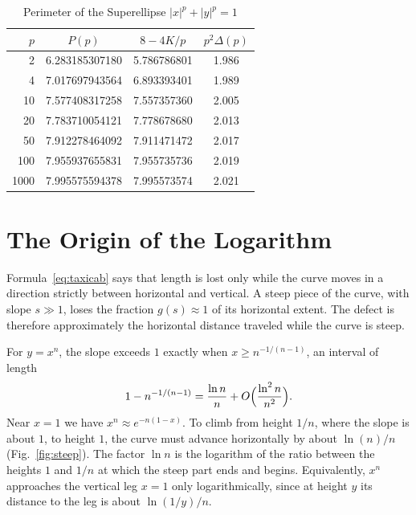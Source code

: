 \documentclass[journal]{IEEEtran}
\begin{document}
\begin{table}[!t]
\caption{Perimeter of the Superellipse $|x|^p+|y|^p=1$}
\label{tab:sq}
\centering
\renewcommand{\arraystretch}{1.2}
\begin{tabular}{@{}rccc@{}}
\toprule
$p$ & $P(p)$ & $8-4K/p$ & $p^2\Delta(p)$\\
\midrule
2    & 6.283185307180 & 5.786786801 & 1.986\\
4    & 7.017697943564 & 6.893393401 & 1.989\\
10   & 7.577408317258 & 7.557357360 & 2.005\\
20   & 7.783710054121 & 7.778678680 & 2.013\\
50   & 7.912278464092 & 7.911471472 & 2.017\\
100  & 7.955937655831 & 7.955735736 & 2.019\\
1000 & 7.995575594378 & 7.995573574 & 2.021\\
\bottomrule
\end{tabular}
\end{table}

\section{The Origin of the Logarithm}\label{sec:why}

Formula~\eqref{eq:taxicab} says that length is lost only while the curve moves in a direction
strictly between horizontal and vertical. A steep piece of the curve, with slope $s\gg1$, loses
the fraction $g(s)\approx1$ of its horizontal extent. The defect is therefore approximately the
horizontal distance traveled while the curve is steep.

For $y=x^n$, the slope exceeds $1$ exactly when $x\ge n^{-1/(n-1)}$, an interval of length
\[
  1-n^{-1/(n-1)}=\frac{\ln n}{n}+O\Bigl(\frac{\ln^2n}{n^2}\Bigr).
\]
Near $x=1$ we have $x^n\approx e^{-n(1-x)}$. To climb from height $1/n$, where the slope is
about $1$, to height $1$, the curve must advance horizontally by about $\ln(n)/n$
(Fig.~\ref{fig:steep}). The factor $\ln n$ is the logarithm of the ratio between the
heights $1$ and $1/n$ at which the steep part ends and begins. Equivalently, $x^n$ approaches
the vertical leg $x=1$ only logarithmically, since at height $y$ its distance to the leg is
about $\ln(1/y)/n$.
\end{document}

